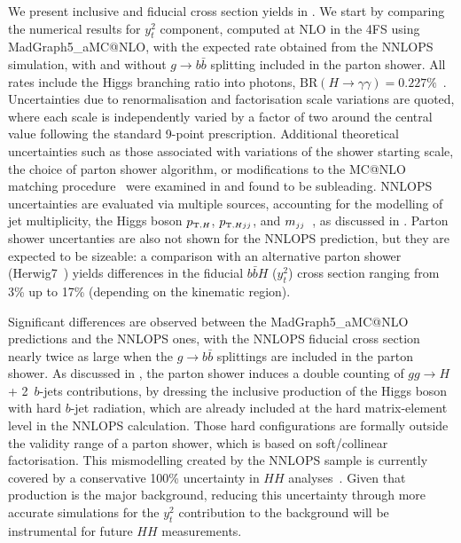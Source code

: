 \documentclass[11pt,a4paper]{article}
\begin{document}
We present inclusive and fiducial cross section yields in .
We start by comparing the numerical results for \bbH{} $y_t^2$ component, computed at NLO in the 4FS using {\sc MadGraph5\_aMC@NLO}, with the 
expected rate obtained from the {\sc NNLOPS} simulation, with and without $g\rightarrow b\bar{b}$ splitting included in the parton shower. 
All rates include the Higgs branching ratio into photons, $\textrm{BR}(H \to \gamma\gamma) = 0.227\%$~\cite{LHCHiggsCrossSectionWorkingGroup:2016ypw}. 
Uncertainties due to renormalisation and factorisation scale variations are quoted, where each scale is independently varied by a factor of two around the 
central value following the standard 9-point prescription. Additional theoretical uncertainties such as those associated with variations of the shower starting scale, 
the choice of parton shower algorithm, or modifications to the MC@NLO matching procedure~\cite{frixione:2002ik,frederix:2020trv} were examined 
in  and found to be subleading. 
{\sc NNLOPS} uncertainties are evaluated via multiple sources, accounting for the modelling of jet multiplicity, the Higgs boson $\ptH$, $\ptHjj$, and $\mjj$~\cite{deFlorian:2016spz,Liu:2013hba,stewart:2013faa,Boughezal:2013oha,Stewart:2011cf,Gangal:2013nxa}, as discussed in . Parton shower uncertanties are also not shown for the {\sc NNLOPS} prediction, but they are expected to be sizeable: a comparison with an alternative parton shower ({\sc Herwig7}~\cite{Bellm:2015jjp}) yields differences in the fiducial $b\bar{b}H$ ($y_t^2$) cross section ranging from 3\% up to 17\% (depending on the kinematic region).


Significant differences are observed between the {\sc MadGraph5\_aMC@NLO} predictions and 
the {\sc NNLOPS} ones, with the {\sc NNLOPS} fiducial cross section nearly twice as large when 
the $g\rightarrow b\bar{b}$ splittings are included in the parton shower. 
As discussed in , the parton shower induces a double counting of 
$gg\to H$ + 2~$b$-jets contributions, by dressing the inclusive production of the Higgs boson with hard $b$-jet
radiation, which are already included at the hard matrix-element level in the {\sc NNLOPS} calculation. 
Those hard configurations are formally outside the validity range of a parton shower, which is based on soft/collinear
factorisation. This mismodelling created by the {\sc NNLOPS} sample is currently covered by a 
conservative 100\% uncertainty in $HH$ analyses~\cite{HDBS-2021-10,ATLAS:2025hhd}. Given
that \bbH{} production is the major background, reducing this uncertainty through more
accurate simulations for the $y_t^2$ contribution to the \bbH{} background will be 
instrumental for future $HH$ measurements.
\end{document}
